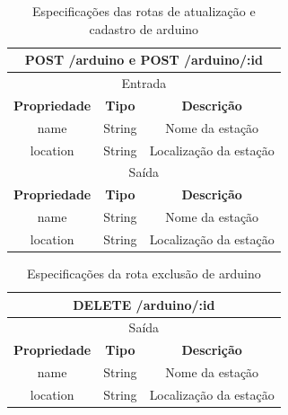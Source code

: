 \begin{table}[H]
    \centering
    \caption{Especificações das rotas de atualização e cadastro de arduino}
    \begin{tabular}{c|c|c}
    \hline
    \multicolumn{3}{c}{\textbf{POST /arduino e POST /arduino/:id}} \\ \hline
    \multicolumn{3}{c}{Entrada}                                                        \\ \hline
    \textbf{Propriedade}         & \textbf{Tipo}         & \textbf{Descrição}            \\  \hline
    name                         & String                & Nome da estação               \\  \hline
    location                     & String                & Localização da estação \\

    \hline

    \multicolumn{3}{c}{Saída}                                                        \\ \hline
    \textbf{Propriedade}         & \textbf{Tipo}         & \textbf{Descrição}            \\  \hline
    name                         & String                & Nome da estação               \\  \hline
    location                     & String                & Localização da estação \\

    \hline
    \end{tabular}
\end{table}

\begin{table}[H]
    \centering
    \caption{Especificações da rota exclusão de arduino}
    \begin{tabular}{c|c|c}
    \hline
    \multicolumn{3}{c}{\textbf{DELETE /arduino/:id}} \\ \hline
    \multicolumn{3}{c}{Saída}                                                          \\ \hline
    \textbf{Propriedade}         & \textbf{Tipo}         & \textbf{Descrição}            \\  \hline
    name                         & String                & Nome da estação               \\  \hline
    location                     & String                & Localização da estação \\

    \hline
    \end{tabular}
\end{table}

